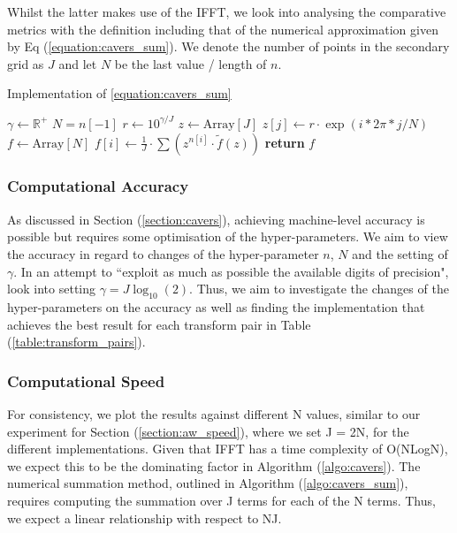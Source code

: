 \documentclass[a4paper]{report}
\begin{document}
Whilst the latter makes use of the IFFT, we look into analysing the comparative metrics with the definition including that of the numerical approximation given by Eq (\ref{equation:cavers_sum}). We denote the number of points in the secondary grid as $J$ and let $N$ be the last value / length of $n$.

\begin{algorithm}[H]
\caption{Implementation of \autoref{equation:cavers_sum}}
\label{algo:cavers_sum}
\begin{algorithmic}[1]
	\State $\gamma \gets \mathbb{R}^+$
	\State $N = n[-1]$
    \State $r \gets 10^{\gamma / J}$ 
    \State $z \gets \text{Array}[J]$
                \State $z[j] \gets r \cdot \exp{(i * 2\pi * j / N)}$
            \EndFor
    \State $f \gets \text{Array}[N]$
        \State $f[i] \gets \frac{1}{J} \cdot \sum (z^{n[i]} \cdot \tilde{f}(z))$ 
    \EndFor
    \State \textbf{return} $f$
\EndProcedure
\end{algorithmic}
\end{algorithm}

\subsubsection{Computational Accuracy}
As discussed in Section (\ref{section:cavers}), achieving machine-level accuracy is possible but requires some optimisation of the hyper-parameters. We aim to view the accuracy in regard to changes of the hyper-parameter $n$, $N$ and the setting of $\gamma$. In an attempt to ``exploit as much as possible the available digits of precision", \citet{loveless2023phelanguido} look into setting $\gamma = J\log_{10}(2)$. Thus, we aim to investigate the changes of the hyper-parameters on the accuracy as well as finding the implementation that achieves the best result for each transform pair in Table (\ref{table:transform_pairs}).

\subsubsection{Computational Speed}
For consistency, we plot the results against different N values, similar to our experiment for Section (\ref{section:aw_speed}), where we set J = 2N, for the different implementations. Given that IFFT has a time complexity of O(NLogN), we expect this to be the dominating factor in Algorithm (\ref{algo:cavers}). The numerical summation method, outlined in Algorithm (\ref{algo:cavers_sum}), requires computing the summation over J terms for each of the N terms. Thus, we expect a linear relationship with respect to NJ.
\end{document}
